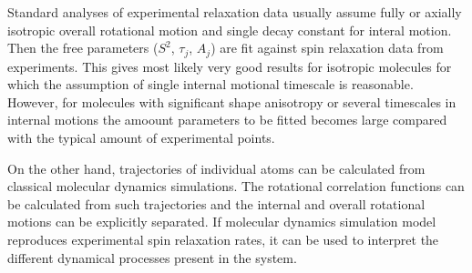 \documentclass[pre,aps,floatfix,authordate1-4,twocolumn]{revtex4-1}
\begin{document}
Standard analyses of experimental relaxation data usually assume
fully or axially isotropic overall rotational motion and single
decay constant for interal motion. Then the free parameters
($S^2$, $\tau_j$, $A_j$) are fit against spin relaxation data
from experiments. This gives most likely very good results for
isotropic molecules for which the assumption of single internal
motional timescale is reasonable. However, for molecules with
significant shape anisotropy or several timescales in internal
motions the amoount parameters to be fitted becomes large compared
with the typical amount of experimental points.

On the other hand, trajectories of individual atoms can be calculated
from classical molecular dynamics simulations. The rotational
correlation functions can be calculated from such trajectories and
the internal and overall rotational motions can be explicitly
separated. If molecular dynamics simulation model reproduces
experimental spin relaxation rates, it can be used to interpret
the different dynamical processes present in the system.
\end{document}
